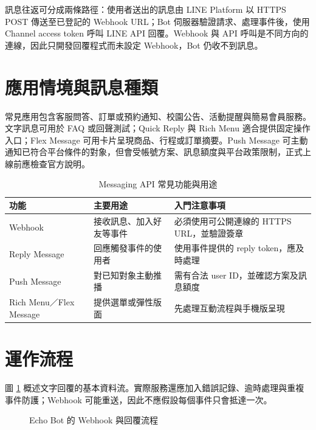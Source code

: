 \documentclass[12pt,a4paper]{report}
\begin{document}
訊息往返可分成兩條路徑：使用者送出的訊息由 LINE Platform 以 HTTPS POST 傳送至已登記的 Webhook URL；Bot 伺服器驗證請求、處理事件後，使用 Channel access token 呼叫 LINE API 回覆。Webhook 與 API 呼叫是不同方向的連線，因此只開發回覆程式而未設定 Webhook，Bot 仍收不到訊息。

\section{應用情境與訊息種類}
常見應用包含客服問答、訂單或預約通知、校園公告、活動提醒與簡易會員服務。文字訊息可用於 FAQ 或回聲測試；Quick Reply 與 Rich Menu 適合提供固定操作入口；Flex Message 可用卡片呈現商品、行程或訂單摘要。Push Message 可主動通知已符合平台條件的對象，但會受帳號方案、訊息額度與平台政策限制，正式上線前應檢查官方說明。

\begin{table}[htbp]
\centering
\caption{Messaging API 常見功能與用途}
\label{tab:features}
\begin{tabularx}{\textwidth}{>{\raggedright\arraybackslash}p{3.0cm} X X}
\toprule
功能 & 主要用途 & 入門注意事項 \\
\midrule
Webhook & 接收訊息、加入好友等事件 & 必須使用可公開連線的 HTTPS URL，並驗證簽章 \\
Reply Message & 回應觸發事件的使用者 & 使用事件提供的 reply token，應及時處理 \\
Push Message & 對已知對象主動推播 & 需有合法 user ID，並確認方案及訊息額度 \\
Rich Menu／Flex Message & 提供選單或彈性版面 & 先處理互動流程與手機版呈現 \\
\bottomrule
\end{tabularx}
\end{table}

\section{運作流程}
圖 \ref{fig:flow} 概述文字回覆的基本資料流。實際服務還應加入錯誤記錄、逾時處理與重複事件防護；Webhook 可能重送，因此不應假設每個事件只會抵達一次。
\begin{figure}[htbp]
\centering
{}
\caption{Echo Bot 的 Webhook 與回覆流程}
\label{fig:flow}
\end{figure}
\end{document}
